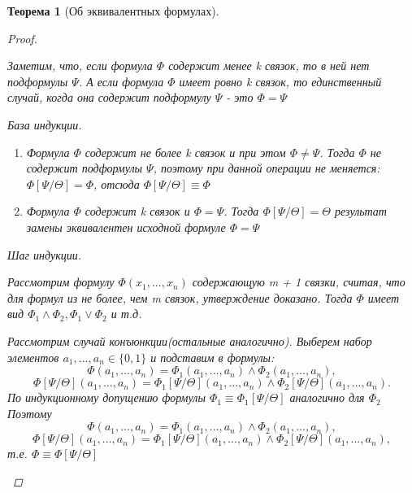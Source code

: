 \documentclass[a4paper]{article}
\newtheorem{theorem}{Теорема}[section]
\theoremstyle{definition}
\theoremstyle{remark}
\begin{document}
\begin{theorem}[Об эквивалентных формулах]
\begin{proof}
\begin{enumerate}
				Заметим, что, если формула $\Phi$ содержит менее k связок, то в ней нет подформулы $\Psi$. А если формула $\Phi$ имеет ровно k связок, то единственный случай, когда она содержит подформулу $\Psi$ - это $\Phi = \Psi$

				База индукции. 
				
				\begin{enumerate}
					\item Формула $\Phi$ содержит не более k связок и при этом $\Phi \neq \Psi$. Тогда $\Phi$ не содержит подформулы $\Psi$, поэтому при данной операции не меняется: $\Phi[\Psi/\Theta] = \Phi$, отсюда $\Phi[\Psi/\Theta] \equiv \Phi$
					\item Формула $\Phi$ содержит k связок и $\Phi = \Psi$. Тогда $\Phi[\Psi/\Theta] = \Theta$ результат замены эквивалентен исходной формуле $\Phi = \Psi$
				\end{enumerate}

				Шаг индукции.

				Рассмотрим формулу $\Phi(x_1, ..., x_n)$ содержающую m + 1 связки, считая, что для формул из не более, чем m связок, утверждение доказано. Тогда $\Phi$  имеет вид $\Phi_1 \wedge \Phi_2, \Phi_1 \vee \Phi_2$ и т.д.

				Рассмотрим случай конъюнкции(остальные аналогично). Выберем набор элементов $a_1, ..., a_n \in \{0, 1\}$ и подставим в формулы: $$\Phi(a_1, ..., a_n) = \Phi_1(a_1, ..., a_n) \wedge \Phi_2(a_1, ..., a_n),$$
				$$\Phi[\Psi/\Theta](a_1, ..., a_n) = \Phi_1[\Psi/\Theta](a_1, ..., a_n) \wedge \Phi_2[\Psi/\Theta](a_1, ..., a_n).$$
				По индукционному допущению формулы $\Phi_1 \equiv \Phi_1[\Psi/\Theta]$ аналогично для $\Phi_2$ Поэтому $$\Phi(a_1, ..., a_n) = \Phi_1(a_1, ..., a_n) \wedge \Phi_2(a_1, ... , a_n),$$
				$$\Phi[\Psi/\Theta](a_1, ..., a_n) = \Phi_1[\Psi/\Theta](a_1, ..., a_n) \wedge \Phi_2[\Psi/\Theta](a_1, ..., a_n),$$ т.е. $\Phi \equiv \Phi[\Psi/\Theta]$
		\end{enumerate}
	\end{proof}
    \end{theorem}
\end{document}
